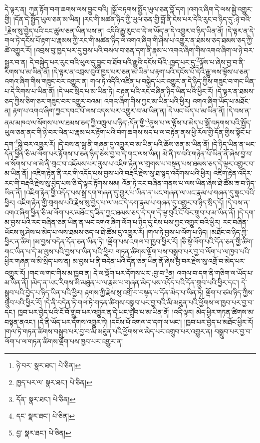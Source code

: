 དེ་ལྟར་ན། ཀུན་རྟོག་བག་ཆགས་ལས་བྱུང་བའི། །སྒྲོ་བཏགས་སྤྱོད་ཡུལ་ཅན་བློ་དག །འགའ་ཞིག་དེ་ལས་སྐྱེ་འགྱུར་གྱི། །དོན་དེ་སྤྱོད་ཡུལ་ཅན་མ་ཡིན། །རང་གི་མཚན་ཉིད་ཀྱི་ཡུལ་ཅན་གྱི་བློ་ནི་ངེས་པར་དེའི་རུང་བ་ཉིད་དུ་:ཉེ་བའི་\footnote{ཉེ་བར་  སྣར་ཐང་།  པེ་ཅིན། }རྗེས་སུ་བྱེད་པའི་ངང་ཚུལ་ཅན་ཡིན་པས་ན། འདིའི་རྒྱུ་རུང་བ་དེ་ལ་ཡོད་ན་དེ་འགྱུར་བ་ཉིད་ཡིན་ནོ། །དེ་ལྟར་ན་དེ་གལ་ཏེ་དངོས་པོ་རྟག་པ་རྣམས་ཀྱི་རང་གི་མཚན་ཉིད་ལ་འགའ་ཞིག་གི་ཤེས་པ་འགྱུར་ན་ཐམས་ཅད་ཐམས་ཅད་ཀྱི་ཚེ་འགྱུར་རོ། །འབྲས་བུ་ཁྱད་པར་དུ་བྱས་པའི་བསལ་བ་ཅན་དག་ནི་རྣམ་པ་འགའ་ཞིག་གིས་འགའ་ཞིག་ལ་ཉེ་བར་སྦྱར་བ་ན། དེ་བསྐྱེད་པར་རུང་བའི་ཕུལ་དུ་བྱུང་བ་ཐོབ་པའི་རྒྱུའི་དངོས་པོའི་:ཁྱད་པར་དུ་\footnote{ཁྱད་པར་ལ་  སྣར་ཐང་།  པེ་ཅིན། }ལྟོས་པ་ཞེས་བྱ་བ་ནི་རིགས་པ་མ་ཡིན་ནོ། །དེ་ལྟར་ན་འབྲས་བུའི་ཁྱད་པར་ཅན་མ་ཡིན་པ་རྟག་པའི་དངོས་པོ་དེའི་རྒྱུ་ལས་ལྟོས་པ་ཅན་འགའ་ཞིག་གིས་གཟུང་བར་འགྱུར་ན། གལ་ཏེ་འདིའི་འཛིན་པ་བསྐྱེད་པར་འགྱུར་ན་དེ་ཉིད་ཀྱིས་གཟུང་བ་གང་ཡིན་པ་དེ་རིགས་པ་ཡིན་ནོ། །དེ་ཡང་སྲིད་པ་མ་ཡིན་ཏེ། བརྟན་པའི་རང་བཞིན་ཉིད་ཡིན་པའི་ཕྱིར་རོ། །དེ་ལྟར་ན་ཐམས་ཅད་ཀྱིས་ཅིག་ཅར་གཟུང་བར་འགྱུར་བའམ། འགའ་ཞིག་གིས་ཀྱང་མ་ཡིན་པའི་ཕྱིར། འགའ་ཞིག་ཡོད་པ་མཐོང་ན། རྟག་པ་འགའ་ཞིག་ཀྱང་དབང་པོ་ལས་འདས་པར་འགྱུར་བ་མ་ཡིན་ན། དེ་ཡང་ཡོད་པ་མ་ཡིན་ནོ། །དེ་བས་ན་ནམ་མཁའ་ལ་སོགས་པ་ལ་ཐམས་ཅད་ཀྱི་འཁྲུལ་པ་ཉིད་:དོན་གྱི་\footnote{དོན་  སྣར་ཐང་།  པེ་ཅིན། }ནུས་པ་ལ་ལྟོས་པ་མེད་པ་སྒྲོ་བཏགས་པའི་སྤྱོད་ཡུལ་ཅན་ནང་གི་ཉེ་བར་ལེན་པ་རྣམ་པར་རྟོག་པའི་བག་ཆགས་སད་པ་ལ་བརྟེན་ནས་ཕྱི་རོལ་གྱི་དོན་གྱིས་སྟོང་པ་དག་\footnote{དང་  སྣར་ཐང་།  པེ་ཅིན། }སྐྱེ་བར་འགྱུར་རོ། །དེ་བས་ན་སྒྲ་ནི་གཞན་དུ་འགྱུར་བ་མ་ཡིན་པའི་ཆོས་ཅན་མ་ཡིན་ནོ། །དེ་ཉིད་ཡིན་ན་ཡང་དོན་ཕྱིན་ཅི་མ་ལོག་པར་རྟོགས་པ་ཅན་ཉིད་ཅེས་བྱ་བ་དེ་གང་ལས་ཡིན། མེ་ནི་ཁ་བའི་གཉེན་པོ་ཡིན་ནོ་ཞེས་བྱ་བ་ལ་སོགས་པ་ལ་མེ་ནི་གྲང་བ་འཇོམས་པར་ནུས་པ་འཇིག་རྟེན་ལ་གྲགས་པ་བསྟན་པས་ཐམས་ཅད་དེ་ལྟར་འགྱུར་བ་མ་ཡིན་ནོ། །འཇིག་རྟེན་ནི་རང་གི་འདོད་པས་བྱས་པའི་བརྡའི་རྗེས་སུ་ཐ་སྙད་འདོགས་པའི་ཕྱིར། འཇིག་རྟེན་འདིར་རང་གི་བརྡའི་རྗེས་སུ་བྱེད་པས་ཅི་དེ་ལྟར་རྟོགས་སམ། འོན་ཏེ་རང་བཞིན་གནས་པ་ལས་ཡིན་ཞེས་ཐེ་ཚོམ་ཟ་བ་ཉིད་ཡིན་ནོ། །འཇིག་རྟེན་གྱི་འདོད་པས་སྒྲ་དག་གཞན་དུ་གྱུར་པ་ཡིན་ན་ཡང་གཞན་ལ་ཡང་རྣམ་པ་གཞན་དུ་སྣང་བའི་ཕྱིར། འཇིག་རྟེན་གྱི་གྲགས་པའི་རྗེས་སུ་བྱེད་པ་ལ་ཡང་དེ་དག་རྣམ་པ་གཞན་དུ་འགྱུར་བ་ཉིད་སྲིད་དོ། །དེ་བས་ན་འགའ་ཞིག་ཕྱིན་ཅི་མ་ལོག་པར་མཐོང་དུ་ཟིན་ཀྱང་ཐམས་ཅད་དེ་དག་དེ་ལྟ་བུའི་ངོ་བོར་གྲུབ་པ་མ་ཡིན་ནོ། །དེ་དག་མ་བྱས་པའི་རང་བཞིན་ཅན་ཡིན་ན་ཡང་འགའ་ཞིག་ལོག་པ་ཉིད་དུ་ངེས་པས་ཀྱང་འགྱུར་བའི་ཕྱིར། རང་བཞིན་ཡོངས་སུ་ཤེས་པ་མེད་པ་ལས་ཐམས་ཅད་ལ་ཐེ་ཚོམ་དུ་འགྱུར་རོ། །གལ་ཏེ་བྱས་པ་ལོག་པ་ཉིད། །མཐོང་བ་ཉིད་ཀྱི་ཕྱིར་ན་ཚིག །མ་བྱས་བདེན་དོན་ཅན་ཡིན་ཏེ། །ལྡོག་པས་འགལ་བ་ཁྱབ་ཕྱིར་རོ། །ཅི་སྟེ་ལོག་པའི་དོན་ཅན་གྱི་ཚིག་གང་ཡིན་པ་དེ་མ་ལུས་པའི་བྱས་པ་ཡིན་པའི་ཕྱིར། གཏན་ཚིགས་ལྡོག་པས་བསྒྲུབ་པར་བྱ་བ་ལོག་པ་ལ་ཁྱབ་པའི་ཕྱིར་གཞན་ལ་མི་སྲིད་པས་ན། མ་བྱས་པ་ནི་བདེན་པའི་དོན་ཅན་ཡིན་ནོ་ཞེས་བྱ་བར་རྗེས་སུ་འགྲོ་བ་མེད་པར་འགྱུར་རོ། །གང་ལ་གང་གིས་མ་ཁྱབ་ན། དེ་ལ་ལྡོག་པར་དོགས་པར་:བྱ་བ་\footnote{བྱ་  སྣར་ཐང་།  པེ་ཅིན། }ན། འགལ་བ་དག་ནི་གཅིག་ལ་ཡོད་པ་མ་ཡིན་ནོ། །མེད་ན་ཡང་རིགས་མི་མཐུན་པ་ལ་རྣམ་པ་གཞན་མེད་པས་འདོད་པའི་དོན་གྲུབ་པའི་ཕྱིར་དང་། དེ་སྒྲུབ་པའི་བྱེད་པ་ཉིད་ཡིན་པའི་ཕྱིར། རྟགས་ཀྱི་རྗེས་སུ་འགྲོ་བ་བསྟན་པ་དོན་མེད་པ་ཡིན་ཏེ། ལྡོག་པ་ཙམ་ཉིད་ཀྱིས་གྲུབ་པའི་ཕྱིར་རོ། །དེ་ནི་བདེན་ཏེ་གལ་ཏེ་གཏན་ཚིགས་བསྒྲུབ་པར་བྱ་བའི་མི་མཐུན་པའི་ཕྱོགས་ལ་ཁྱབ་པར་བྱ་བ་དང་། ཁྱབ་པར་བྱེད་པའི་ངོ་བོ་གྲུབ་པར་འགྱུར་ན་དེ་ཡང་གྲུབ་པ་མ་ཡིན་ནོ། །འདི་ལྟར། མེད་ཕྱིར་གཏན་ཚིགས་མ་བསྟན་ནའང་། །དེ་ནི་ཡོད་པར་དོགས་འགྱུར་ཏེ། །དངོས་པོ་འགལ་བ་དག་ལ་ཡང་། །ཁྱབ་པར་བྱེད་པ་མཐོང་ཕྱིར་རོ། །གལ་ཏེ་གཏན་ཚིགས་བསྒྲུབ་པར་བྱ་བ་མི་མཐུན་པའི་ཕྱོགས་ལ་མེད་པར་འགྲུབ་པར་འགྱུར་ན། བསྒྲུབ་པར་བྱ་བ་ལོག་པ་ལ་གཏན་ཚིགས་ལྡོག་པས་ཁྱབ་པར་འགྱུར་ན། 